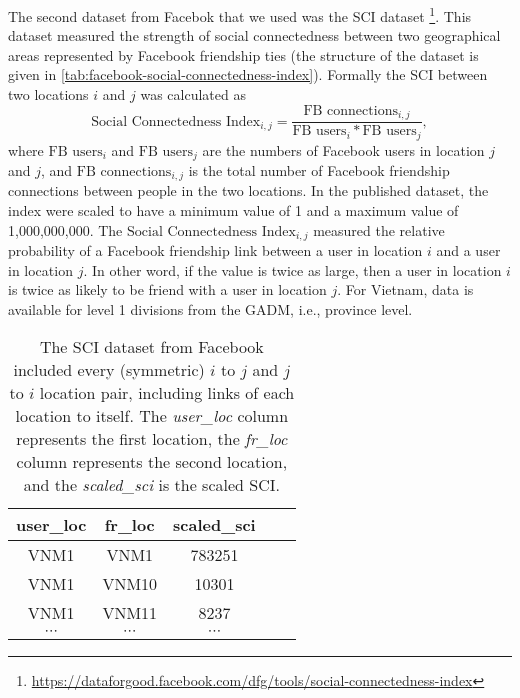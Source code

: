 The second dataset from Facebok that we used was the \gls{SCI} dataset \footnote{\url{https://dataforgood.facebook.com/dfg/tools/social-connectedness-index}}.
This dataset measured the strength of social connectedness between two geographical areas represented by Facebook friendship ties (the structure of the dataset is given in \autoref{tab:facebook-social-connectedness-index}).
Formally the \gls{SCI} between two locations $i$ and $j$ was calculated as
\begin{equation*}
    \text{Social Connectedness Index}_{i,j} = \frac{\text{FB connections}_{i,j}}{\text{FB users}_i * \text{FB users}_j},
\end{equation*}
where $\text{FB users}_i$ and $\text{FB users}_j$ are the numbers of Facebook users in location $j$ and $j$, and $\text{FB connections}_{i,j}$ is the total number of Facebook friendship connections between people in the two locations.
In the published dataset, the index were scaled to have a minimum value of 1 and a maximum value of 1,000,000,000.
The $\text{Social Connectedness Index}_{i,j}$ measured the relative probability of a Facebook friendship link between a user in location $i$ and a user in location $j$.
In other word, if the value is twice as large, then a user in location $i$ is twice as likely to be friend with a user in location $j$.
For Vietnam, data is  available for level 1 divisions from the \gls{GADM}, i.e., province level.

\begin{table}[h]
\centering
\begin{tabular}{| c | c | c | c | c |}
    user\_loc & fr\_loc & scaled\_sci \\
    \hline\hline
    VNM1 & VNM1 & 783251 \\
    \hline
    VNM1 & VNM10 & 10301 \\
    \hline
    VNM1 & VNM11 & 8237 \\
    \hline
    $\cdots$ & $\cdots$ & $\cdots$ \\
\end{tabular}
\caption{The \gls{SCI} dataset from Facebook included every (symmetric) $i$ to $j$ and $j$ to $i$ location pair, including links of each location to itself. The \textit{user\_loc} column represents the first location, the \textit{fr\_loc} column represents the second location, and the \textit{scaled\_sci} is the scaled \gls{SCI}.}
\label{tab:facebook-social-connectedness-index}
\end{table}

